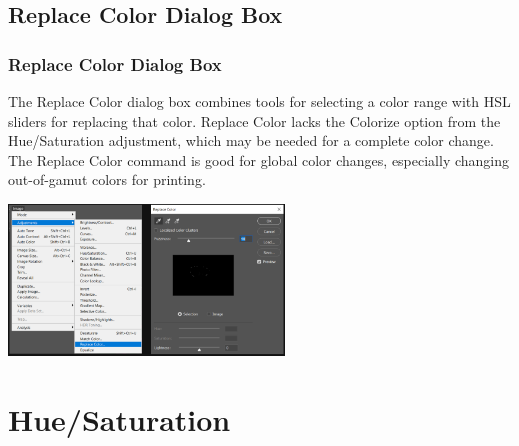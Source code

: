 \documentclass{beamer}
\begin{document}
\subsection{Replace Color Dialog Box}		
\begin{frame}
	\frametitle{Replace Color Dialog Box}
					\begin{outline}
		\1 The Replace Color dialog box combines tools for selecting a color range with HSL sliders for replacing that color.
		\1 Replace Color lacks the Colorize option from the Hue/Saturation adjustment, which may be needed for a complete color change. 
		\1 The Replace Color command is good for global color changes, especially changing out-of-gamut colors for printing.
	\end{outline}
\begin{center}
\includegraphics[width=0.55\textwidth]{images/replace color dialog box.png}
\end{center}
\end{frame}

	\section{Hue/Saturation}
\end{document}
